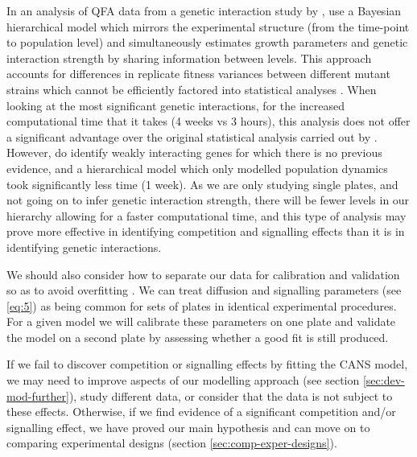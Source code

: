 In an analysis of QFA data from a genetic interaction study by
\citet{Addinall2011}, \citet{Heydari2016} use a Bayesian hierarchical
model which mirrors the experimental structure (from the time-point to
population level) and simultaneously estimates growth parameters and
genetic interaction strength by sharing information between
levels. This approach accounts for differences in replicate fitness
variances between different mutant strains which cannot be efficiently
factored into statistical analyses \citep{Heydari2016}. When looking
at the most significant genetic interactions, for the increased
computational time that it takes (4 weeks vs 3 hours), this analysis
does not offer a significant advantage over the original statistical
analysis carried out by \citet{Addinall2011}. However,
\citet{Heydari2016} do identify weakly interacting genes for which
there is no previous evidence, and a hierarchical model which only
modelled population dynamics took significantly less time (1 week). As
we are only studying single plates, and not going on to infer genetic
interaction strength, there will be fewer levels in our hierarchy
allowing for a faster computational time, and this type of analysis
may prove more effective in identifying competition and signalling
effects than it is in identifying genetic interactions.

We should also consider how to separate our data for calibration and
validation so as to avoid overfitting \citep{Hawkins2004}. We can treat
diffusion and signalling parameters (see \ref{eq:5}) as being common
for sets of plates in identical experimental procedures. For a given
model we will calibrate these parameters on one plate and validate the
model on a second plate by assessing whether a good fit is still
produced.


If we fail to discover competition or signalling effects by fitting
the CANS model, we may need to improve aspects of our modelling
approach (see section \ref{sec:dev-mod-further}), study different
data, or consider that the data is not subject to these
effects. Otherwise, if we find evidence of a significant competition
and/or signalling effect, we have proved our main hypothesis and can
move on to comparing experimental designs (section
\ref{sec:comp-exper-designs}).

